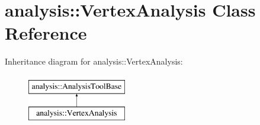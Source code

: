 \hypertarget{classanalysis_1_1VertexAnalysis}{}\section{analysis\+:\+:Vertex\+Analysis Class Reference}
\label{classanalysis_1_1VertexAnalysis}
Inheritance diagram for analysis\+:\+:Vertex\+Analysis\+:\begin{figure}[H]
\begin{center}
\leavevmode
\includegraphics[height=2.000000cm]{classanalysis_1_1VertexAnalysis}
\end{center}
\end{figure}
